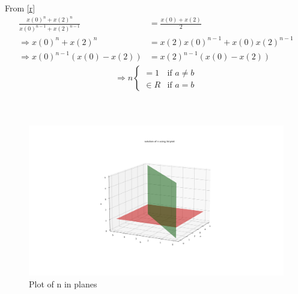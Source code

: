\documentclass[journal,12pt,twocolumn]{IEEEtran}
\theoremstyle{remark}
\begin{document}
From \eqref{r}
\begin{align}
    \frac{x(0)^n +x(2)^n}{x(0)^{n-1} + x(2)^{n-1}}&= \frac{x(0)+x(2)}{2}  \\
    \Rightarrow x(0)^n+x(2)^n&=x(2)x(0)^{n-1}+x(0)x(2)^{n-1} \\
    \Rightarrow x(0)^{n-1}(x(0)-x(2))&=x(2)^{n-1}(x(0)-x(2))\label{2}
 \end{align}
\begin{align}
	\Rightarrow n
	\begin{cases}
		=1  &\text{if } a\neq b\\
		\in R &\text{if } a=b
	\end{cases}
\end{align}
\\
\\
\begin{figure}[h!]
	\centering
	\includegraphics[width=2.5\columnwidth]{final2.png}
	\caption{Plot of n in planes}
	\label{solution}
\end{figure}

 
\end{document}
